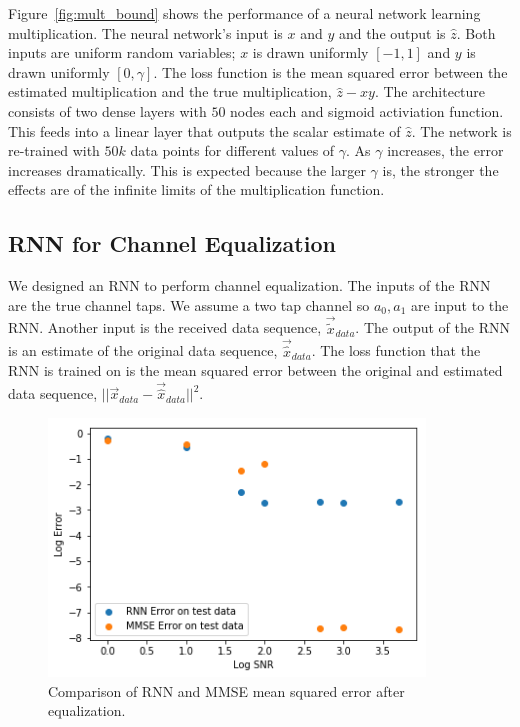 Figure~\ref{fig:mult_bound} shows the performance of a neural network learning multiplication.
The neural network's input is $x$ and $y$ and the output is $\hat{z}$.  Both inputs are uniform random variables; $x$ is drawn uniformly $[-1,1]$ and $y$ is drawn uniformly $[0,\gamma]$. 
The loss function is the mean squared error between the estimated multiplication and the true multiplication, $\hat{z}-xy$.
The architecture consists of two dense layers with $50$ nodes each and sigmoid activiation function.  This feeds into a linear layer that outputs the scalar estimate of $\hat{z}$.  
The network is re-trained with $50k$ data points for different values of $\gamma$. As $\gamma$ increases, the error increases dramatically.  This is expected because the larger $\gamma$ is, the stronger the effects are of the infinite limits of the multiplication function.


\subsection{RNN for Channel Equalization}

We designed an RNN to perform channel equalization.
The inputs of the RNN are the true channel taps.  We assume a two tap channel so $a_0, a_1$ are input to the RNN.  Another input is the received data sequence, $\vec{\tilde{x}}_{data}$.
The output of the RNN is an estimate of the original data sequence, $\vec{\hat{x}}_{data}$. 
The loss function that the RNN is trained on is the mean squared error between the original and estimated data sequence, $||\vec{x}_{data}-\vec{\hat{x}}_{data}||^2$.

\begin{figure}
\begin{center}
\includegraphics[width=100mm]{figures/equal/RNN_vs_MMSE.png}
\caption{Comparison of RNN and MMSE mean squared error after equalization.}
\label{fig:rnn_vs_mmse}
\end{center}
\end{figure}

